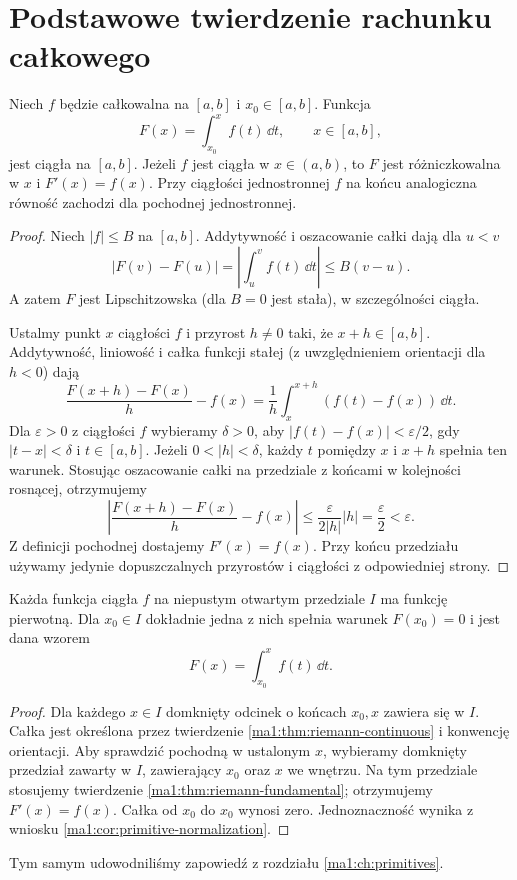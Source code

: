 \section{Podstawowe twierdzenie rachunku całkowego}
\begin{twierdzenie}
\label{ma1:thm:riemann-fundamental}
Niech $f$ będzie całkowalna na $[a,b]$ i $x_0\in[a,b]$. Funkcja
\[
 F(x)=\int_{x_0}^x f(t)\,\dd t,\qquad x\in[a,b],
\]
jest ciągła na $[a,b]$. Jeżeli $f$ jest ciągła w $x\in(a,b)$, to $F$ jest różniczkowalna w $x$ i $F'(x)=f(x)$. Przy ciągłości jednostronnej $f$ na końcu analogiczna równość zachodzi dla pochodnej jednostronnej.
\end{twierdzenie}
\begin{proof}
Niech $|f|\le B$ na $[a,b]$. Addytywność i oszacowanie całki dają dla $u<v$
\[
 |F(v)-F(u)|=\left|\int_u^v f(t)\,\dd t\right|\le B(v-u).
\]
A zatem $F$ jest Lipschitzowska (dla $B=0$ jest stała), w szczególności ciągła.

Ustalmy punkt $x$ ciągłości $f$ i przyrost $h\ne0$ taki, że $x+h\in[a,b]$. Addytywność, liniowość i całka funkcji stałej (z uwzględnieniem orientacji dla $h<0$) dają
\[
 \frac{F(x+h)-F(x)}h-f(x)
 =\frac1h\int_x^{x+h}(f(t)-f(x))\,\dd t.
\]
Dla $\varepsilon>0$ z ciągłości $f$ wybieramy $\delta>0$, aby $|f(t)-f(x)|<\varepsilon/2$, gdy $|t-x|<\delta$ i $t\in[a,b]$. Jeżeli $0<|h|<\delta$, każdy $t$ pomiędzy $x$ i $x+h$ spełnia ten warunek. Stosując oszacowanie całki na przedziale z końcami w kolejności rosnącej, otrzymujemy
\[
 \left|\frac{F(x+h)-F(x)}h-f(x)\right|
 \le\frac{\varepsilon}{2|h|}|h|=\frac{\varepsilon}{2}<\varepsilon.
\]
Z definicji pochodnej dostajemy $F'(x)=f(x)$. Przy końcu przedziału używamy jedynie dopuszczalnych przyrostów i ciągłości z odpowiedniej strony.
\end{proof}
\begin{wniosek}
\label{ma1:cor:continuous-primitive-existence}
Każda funkcja ciągła $f$ na niepustym otwartym przedziale $I$ ma funkcję pierwotną. Dla $x_0\in I$ dokładnie jedna z nich spełnia warunek $F(x_0)=0$ i jest dana wzorem
\[
 F(x)=\int_{x_0}^x f(t)\,\dd t.
\]
\end{wniosek}
\begin{proof}
Dla każdego $x\in I$ domknięty odcinek o końcach $x_0,x$ zawiera się w $I$. Całka jest określona przez twierdzenie \ref{ma1:thm:riemann-continuous} i konwencję orientacji. Aby sprawdzić pochodną w ustalonym $x$, wybieramy domknięty przedział zawarty w $I$, zawierający $x_0$ oraz $x$ we wnętrzu. Na tym przedziale stosujemy twierdzenie \ref{ma1:thm:riemann-fundamental}; otrzymujemy $F'(x)=f(x)$. Całka od $x_0$ do $x_0$ wynosi zero. Jednoznaczność wynika z wniosku \ref{ma1:cor:primitive-normalization}.
\end{proof}
Tym samym udowodniliśmy zapowiedź z rozdziału \ref{ma1:ch:primitives}.

